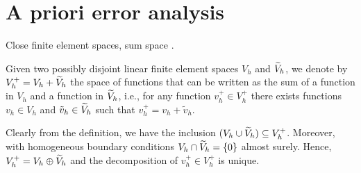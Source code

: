\documentclass[10pt]{article}
\begin{document}
\section{A priori error analysis}

Close finite element spaces, sum space \cite{GaL15, BaK93}. 

\begin{definition} Given two possibly disjoint linear finite element spaces $V_h$ and $\widetilde V_h$, we denote by $V_h^+ = V_h + \widetilde V_h$  the space of functions that can be written as the sum of a function in $V_h$ and a function in $\widetilde V_h$, i.e., for any function $v_h^+ \in V_h^+$ there exists functions $v_h \in V_h$ and $\tilde v_h \in \widetilde V_h$ such that $v_h^+ = v_h + \tilde v_h$. 
\end{definition}

\begin{remark} Clearly from the definition, we have the inclusion $(V_h \cup \widetilde V_h) \subseteq V_h^+$. Moreover, with homogeneous boundary conditions $V_h \cap \widetilde V_h = \{0\}$ almost surely. Hence, $V_h^+ = V_h \oplus \widetilde V_h$ and the decomposition of $v_h^+ \in V_h^+$ is unique.
\end{remark}
\end{document}
